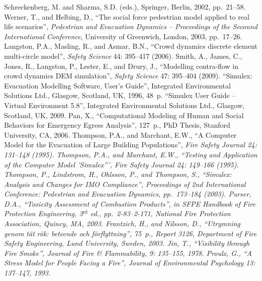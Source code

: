 \documentclass[12pt,a4paper,final,twoside]{stylevk}
\begin{document}
\begin{thebibliography}{99}
  Schreckenberg, M. and Sharma, S.D. (eds.), Springer, Berlin, 2002,
  pp.~21--58.
%
 Werner, T., and Helbing, D., ``The social force
  pedestrian model applied to real life scenarios'', \emph{Pedestrian
    and Evacuation Dynamics -- Proceedings of the Seconnd International
    Conference}, University of Greenwich, London, 2003, pp.~17--26.
%
 Langston, P.A., Masling, R., and Asmar, B.N.,
  ``Crowd dynamics discrete element multi-circle model'', \emph{Safety
    Science} 44: 395--417 (2006).
%
 Smith, A., James, C., Jones, R., Langston, P.,
  Lester, E., and Drury, J., ``Modelling contra-flow in crowd dynamics
  DEM simulation'', \emph{Safety Science} 47: 395--404 (2009).
%
 ``Simulex: Evacuation Modelling Software, User's
  Guide'', Integrated Environmental Solutions Ltd., Glasgow, Scotland,
  UK, 1996, 48~p.
%
 ``Simulex User Guide -- Virtual Environment 5.8'',
  Integrated Environmental Solutions Ltd., Glasgow, Scotland, UK,
  2009.
%
 Pan, X., ``Computational Modeling of Human and Social
  Behaviors for Emergency Egress Analysis'', 127~p., PhD Thesis,
  Stanford University, CA, 2006.
%
 Thompson, P.A., and Marchant, E.W., ``A Computer
  Model for the Evacuation of Large Building Populations'', \em Fire
  Safety Journal \em 24: 131--148 (1995).
%
 Thompson, P.A., and Marchant, E.W., ``Testing
  and Application of the Computer Model 'Simulex''', \em Fire Safety
  Journal \em 24: 149--166 (1995).
%
 Thompson, P., Lindstrom, H., Ohlsson, P., and
  Thompson, S., ``Simulex: Analysis and Changes for IMO Compliance'',
  Proceedings of 2nd International Conference: Pedestrian and
  Evacuation Dynamics, pp.~173--184 (2003).
%
 Purser, D.A., ``Toxicity Assessment of Combustion
  Products'', in \emph{SFPE Handbook of Fire Protection Engineering},
  3${}^\textrm{rd}$ ed., pp.~2-83--2-171, National Fire Protection
  Association, Quincy, MA, 2003.
%
 Frantzich, H., and Nilsson, D., ``Utrymning
  genom tät r\"ok: beteende och f\"orflyttning'', 75~p., Report 3126,
  Department of Fire Safety Engineering, Lund University, Sweden,
  2003.
%
 Jin, T., ``Visibility through Fire Smoke'',
  \emph{Journal of Fire \& Flammability}, 9: 135--155, 1978.
%
 Proulx, G., ``A Stress Model for People Facing a
  Fire'', \emph{Journal of Environmental Psychology} 13: 137--147,
  1993.
%

\end{thebibliography}
\end{document}
